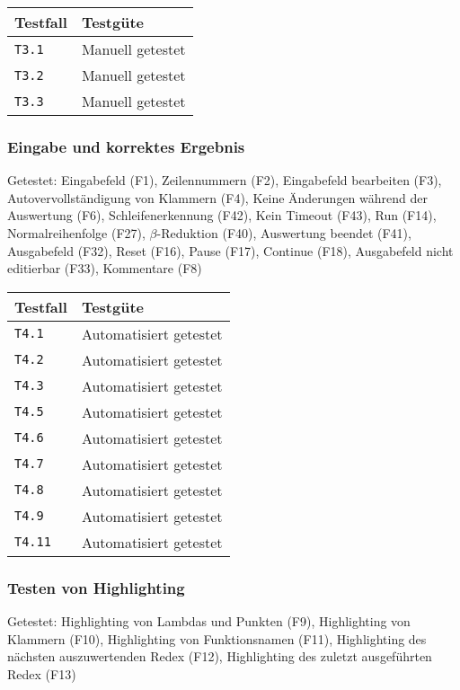 \documentclass[parskip=full,11pt,twoside]{scrartcl}
\newcommand{\testline}[2]{
    \texttt{#1} & 
    \ifthenelse{\equal{#2}{Nicht getestet}}
        {\cellcolor{red!20}}
        {}
    \ifthenelse{\equal{#2}{Manuell getestet}}
        {\cellcolor{LimeGreen!20}}
        {}
    \ifthenelse{\equal{#2}{Automatisiert getestet}}
        {\cellcolor{green!20}}
        {}
    \ifthenelse{\equal{#2}{Nicht testbar}}
    {\cellcolor{gray!20}}
     {}
    #2 \\ \hline
}
\begin{document}
    \label{shortcuts}
    \begin{center}
        \begin{tabular}{ p{9cm} p{4cm}}
            Testfall & Testgüte \\ \hline
            \testline{T3.1}{Manuell getestet}
            \testline{T3.2}{Manuell getestet}
            \testline{T3.3}{Manuell getestet}
        \end{tabular}
    \end{center}

\subsubsection{Eingabe und korrektes Ergebnis}
    Getestet:
    Eingabefeld (F1),
    Zeilennummern (F2),
    Eingabefeld bearbeiten (F3),
    Autovervollständigung von Klammern (F4),
    Keine Änderungen während der Auswertung (F6),
    Schleifenerkennung (F42),
    Kein Timeout (F43),
    Run (F14),
    Normalreihenfolge (F27),
    $\beta$-Reduktion (F40),
    Auswertung beendet (F41),
    Ausgabefeld (F32),
    Reset (F16),
    Pause (F17),
    Continue (F18),
    Ausgabefeld nicht editierbar (F33),
    Kommentare (F8)

    \label{shortcuts}
    \begin{center}
        \begin{tabular}{ p{9cm} p{4cm}}
            Testfall & Testgüte \\ \hline
            \testline{T4.1}{Automatisiert getestet}
            \testline{T4.2}{Automatisiert getestet}
            \testline{T4.3}{Automatisiert getestet}
            \testline{T4.5}{Automatisiert getestet}
            \testline{T4.6}{Automatisiert getestet}
            \testline{T4.7}{Automatisiert getestet}
            \testline{T4.8}{Automatisiert getestet}
            \testline{T4.9}{Automatisiert getestet}
            \testline{T4.11}{Automatisiert getestet}
        \end{tabular}
    \end{center}

\subsubsection{Testen von Highlighting}
    Getestet:
    Highlighting von Lambdas und Punkten (F9),
    Highlighting von Klammern (F10),
    Highlighting von Funktionsnamen (F11),
    Highlighting des nächsten auszuwertenden Redex (F12),
    Highlighting des zuletzt ausgeführten Redex (F13)
\end{document}
